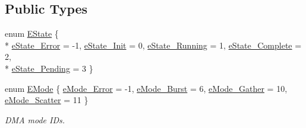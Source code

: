 \subsection*{Public Types}
\begin{DoxyCompactItemize}
\item 
enum \hyperlink{a00095_a64e694fd40d32179e429eb7934a64842}{E\+State} \{ \\*
\hyperlink{a00095_a64e694fd40d32179e429eb7934a64842a69a920ab4dfa07772db187753b2792c3}{e\+State\+\_\+\+Error} = -\/1, 
\hyperlink{a00095_a64e694fd40d32179e429eb7934a64842a30c329d408f76e22e599bd595d5a05ee}{e\+State\+\_\+\+Init} = 0, 
\hyperlink{a00095_a64e694fd40d32179e429eb7934a64842ab6dd06647cf9721e5b0b737952c3bb95}{e\+State\+\_\+\+Running} = 1, 
\hyperlink{a00095_a64e694fd40d32179e429eb7934a64842a0bc0574a45ed068800b0c7478084ae59}{e\+State\+\_\+\+Complete} = 2, 
\\*
\hyperlink{a00095_a64e694fd40d32179e429eb7934a64842ac7d67500e8f2bb9c260956db33549d4f}{e\+State\+\_\+\+Pending} = 3
 \}
\item 
enum \hyperlink{a00095_af8d0f19f2896dd6dbd126b919b24e39b}{E\+Mode} \{ \hyperlink{a00095_af8d0f19f2896dd6dbd126b919b24e39ba258186a22f0d1691d0cb369c5af278a8}{e\+Mode\+\_\+\+Error} = -\/1, 
\hyperlink{a00095_af8d0f19f2896dd6dbd126b919b24e39ba253c129077dc004dd83cca8931e69eb9}{e\+Mode\+\_\+\+Burst} = 6, 
\hyperlink{a00095_af8d0f19f2896dd6dbd126b919b24e39badec2b76540ba9a168b7a049acb50654d}{e\+Mode\+\_\+\+Gather} = 10, 
\hyperlink{a00095_af8d0f19f2896dd6dbd126b919b24e39bac8f3cbed92bc7d135e306cc154ac2ae6}{e\+Mode\+\_\+\+Scatter} = 11
 \}
\begin{DoxyCompactList}\small\item\em D\+M\+A mode I\+Ds. \end{DoxyCompactList}\end{DoxyCompactItemize}

